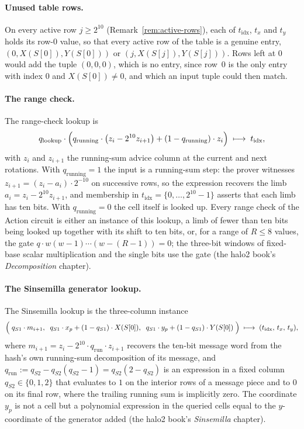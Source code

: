 \documentclass[11pt,a4paper]{article}
\theoremstyle{definition}
\begin{document}
\paragraph{Unused table rows.}
On every active row $j \ge 2^{10}$ (Remark~\ref{rem:active-rows}), each
of $t_{\mathrm{idx}}$, $t_x$ and $t_y$ holds its row-$0$ value, so that
every active row of the table is a genuine entry, $(0, X(S[0]), Y(S[0]))$
or $(j, X(S[j]), Y(S[j]))$. Rows left at $0$ would add the tuple
$(0, 0, 0)$, which is no entry, since row~$0$ is the only entry with
index $0$ and $X(S[0]) \ne 0$, and which an input tuple could then
match.

\paragraph{The range check.}
The range-check lookup is
\begin{equation}\label{eq:halo2-lookup-range}
q_{\mathrm{lookup}} \cdot \Bigl(
  q_{\mathrm{running}} \cdot \bigl(z_i - 2^{10} z_{i+1}\bigr)
  + (1 - q_{\mathrm{running}}) \cdot z_i \Bigr)
\;\longmapsto\; t_{\mathrm{idx}},
\end{equation}
with $z_i$ and $z_{i+1}$ the running-sum advice column at the current and
next rotations. With $q_{\mathrm{running}} = 1$ the input is a running-sum
step: the prover witnesses $z_{i+1} = (z_i - a_i) \cdot 2^{-10}$ on
successive rows, so the expression recovers the limb
$a_i = z_i - 2^{10} z_{i+1}$, and membership in
$t_{\mathrm{idx}} = \{0, \dots, 2^{10} - 1\}$ asserts that each limb has ten
bits. With $q_{\mathrm{running}} = 0$ the cell itself is looked up.
Every range check of the Action circuit is either an instance of this
lookup, a limb of fewer than ten bits being looked up together with its
shift to ten bits, or, for a range of $R \le 8$ values, the gate
$q \cdot w(w - 1)\cdots(w - (R - 1)) = 0$; the three-bit windows of
fixed-base scalar multiplication and the single bits use the gate (the
halo2 book's \emph{Decomposition} chapter).

\paragraph{The Sinsemilla generator lookup.}
The Sinsemilla lookup is the three-column instance
\begin{equation}\label{eq:halo2-lookup-sinsemilla}
\Bigl(\;
q_{S1} \cdot m_{i+1},\;\;
q_{S1} \cdot x_p + (1 - q_{S1}) \cdot X(S[0]),\;\;
q_{S1} \cdot y_p + (1 - q_{S1}) \cdot Y(S[0])
\;\Bigr)
\;\longmapsto\;
(t_{\mathrm{idx}},\, t_x,\, t_y),
\end{equation}
where $m_{i+1} = z_i - 2^{10} \cdot q_{\mathrm{run}} \cdot z_{i+1}$ recovers
the ten-bit message word from the hash's own running-sum decomposition of its
message, and $q_{\mathrm{run}} := q_{S2} - q_{S2}(q_{S2} - 1)
= q_{S2}(2 - q_{S2})$ is an expression in a fixed column
$q_{S2} \in \{0, 1, 2\}$ that evaluates to $1$ on the interior rows of a
message piece and to $0$ on its final row, where the trailing running sum
is implicitly zero. The coordinate $y_p$ is not a cell but a polynomial
expression in the queried cells equal to the $y$-coordinate of the
generator added (the halo2 book's \emph{Sinsemilla} chapter).
\end{document}
